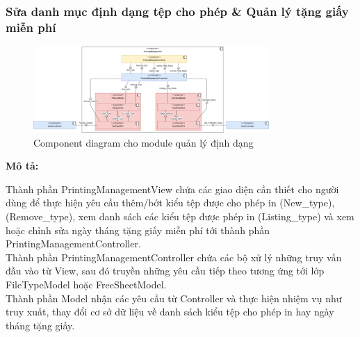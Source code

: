 \subsubsection{Sửa danh mục định dạng tệp cho phép \& Quản lý tặng giấy miễn phí}

\begin{figure}[H]
    \begin{center}        
    \includegraphics[width=0.8\textwidth]{Images/Architecture Design/PS_Component.png}
        \caption{Component diagram cho module quản lý định dạng}
        \label{fig:arch}
    \end{center}
\end{figure}

\textbf{Mô tả:}\par
Thành phần PrintingManagementView chứa các giao diện cần thiết cho người dùng để thực hiện yêu cầu thêm/bớt kiểu tệp được cho phép in (New\_type), (Remove\_type), xem danh sách các kiểu tệp được phép in (Listing\_type) và xem hoặc chỉnh sửa ngày tháng tặng giấy miễn phí tới thành phần PrintingManagementController. \\
Thành phần PrintingManagementController chứa các bộ xử lý những truy vấn đầu vào từ View, sau đó truyền những yêu cầu tiếp theo tương ứng tới lớp FileTypeModel hoặc FreeSheetModel. \\
Thành phần Model nhận các yêu cầu từ Controller và thực hiện nhiệm vụ như truy xuất, thay đổi cơ sở dữ liệu về danh sách kiểu tệp cho phép in hay ngày tháng tặng giấy.

